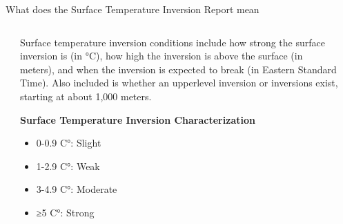 \documentclass[final, xcolor=table]{beamer}
\newlength{\sepwidth}
\newlength{\colwidth}
\newcommand{\separatorcolumn}{\begin{column}{\sepwidth}\end{column}}
\begin{document}
\begin{frame}[t]
\begin{columns}[t]
\begin{column}{\colwidth}
\begin{block}{What does the Surface Temperature Inversion Report mean}
\begin{columns}[T]
\begin{column}{0.43\linewidth}
        \end{column}
        
        \begin{column}{0.5\linewidth}
        
            Surface temperature inversion conditions include how strong the surface inversion is (in °C), how high the inversion is above the surface (in meters), and when the inversion is expected to break (in Eastern Standard Time). Also included is whether an upperlevel inversion or inversions exist, starting at about 1,000 meters.
            
            \textbf{Surface Temperature Inversion Characterization}
                \begin{itemize}
                  \item 0-0.9 C°: Slight
                  \item 1-2.9 C°: Weak
                  \item 3-4.9 C°: Moderate
                  \item ≥5 C°: Strong
                \end{itemize}
        \end{column}
    
    \end{columns}    


  \end{block}


\end{column}

\separatorcolumn
\end{columns}
\end{frame}
\end{document}
